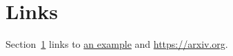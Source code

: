 \documentclass{article}
\begin{document}
\section{Links}\label{sec}
Section~\ref{sec} links to \href{https://example.org}{an example} and \url{https://arxiv.org}.
\end{document}
